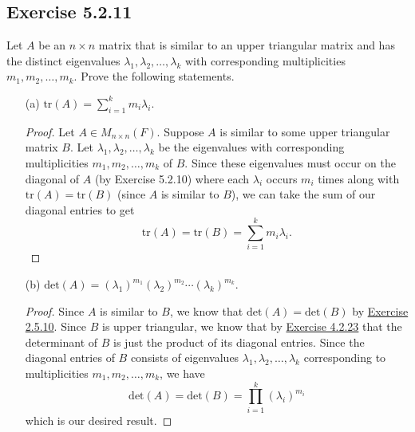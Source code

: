 \subsection*{Exercise 5.2.11} Let \( A  \) be an \( n \times n  \) matrix that is similar to an upper triangular matrix and has the distinct eigenvalues \( {\lambda}_{1}, {\lambda}_{2}, \dots, {\lambda}_{k} \) with corresponding multiplicities \( {m}_{1}, {m}_{2}, \dots, {m}_{k } \). Prove the following statements. 
\begin{enumerate}
    \item[(a)] \( \text{tr}(A) = \sum_{ i=1  }^{ k  } {m}_{i} {\lambda}_{i} \).
        \begin{proof}
            Let \( A \in {M}_{n \times n}(F) \). Suppose \( A  \) is similar to some upper triangular matrix \( B  \). Let \( {\lambda}_{1}, {\lambda}_{2}, \dots, {\lambda}_{k } \) be the eigenvalues with corresponding multiplicities \( {m}_{1}, {m}_{2}, \dots, {m}_{k } \) of \( B  \). Since these eigenvalues must occur on the diagonal of \( A  \) (by Exercise 5.2.10) where each \( {\lambda}_{i} \) occurs \( {m}_{i}  \) times along with \( \text{tr}(A) = \text{tr}(B) \) (since \( A  \) is similar to \( B \)), we can take the sum of our diagonal entries to get
            \[  \text{tr}(A) = \text{tr}(B) =  \sum_{ i=1 }^{ k   } {m}_{i} {\lambda}_{i}. \]
        \end{proof}
    \item[(b)] \( \text{det}(A) = ({\lambda}_{1})^{{m}_{1}} ({\lambda}_{2})^{{m}_{2}} \cdots ({\lambda}_{k})^{{m}_{k}} \).
        \begin{proof}
        Since \( A  \) is similar to \( B  \), we know that \( \text{det}(A) = \text{det}(B) \) by {\hyperref[Exercise 2.5.10]{Exercise 2.5.10}}. Since \( B  \) is upper triangular, we know that by {\hyperref[Exercise 4.2.23]{Exercise 4.2.23}} that the determinant of \( B  \) is just the product of its diagonal entries. Since the diagonal entries of \( B  \) consists of eigenvalues \( {\lambda}_{1}, {\lambda}_{2}, \dots, {\lambda}_{k} \) corresponding to multiplicities \( {m}_{1}, {m}_{2}, \dots, {m}_{k} \), we have  
        \[  \text{det}(A) = \text{det}(B) = \prod_{i=1}^{k} ({\lambda}_{i})^{{m}_{i}}  \]
        which is our desired result.
        \end{proof}
\end{enumerate}


